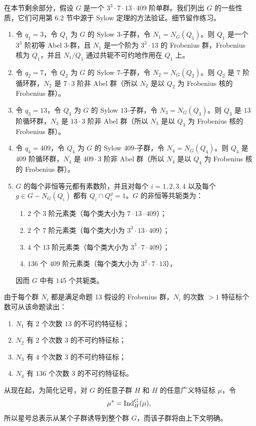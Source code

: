 在本节剩余部分，假设 $G$ 是一个 $3^3\cdot7\cdot13\cdot409$ 阶单群。我们列出 $G$ 的一些性质，它们可用第 6.2 节中源于 Sylow 定理的方法验证。细节留作练习。
\begin{enumerate}[label=(\arabic*)]
  \item 令 $q_1=3$，令 $Q_1$ 为 $G$ 的 Sylow $3$-子群，令 $N_1=N_G(Q_1)$。则 $Q_1$ 是一个 $3^3$ 阶初等 Abel $3$-群，且 $N_1$ 是一个阶为 $3^3\cdot13$ 的 Frobenius 群，Frobenius 核为 $Q_1$，并且 $N_1/Q_1$ 通过共轭不可约地作用在 $Q_1$ 上。
  \item 令 $q_2=7$，令 $Q_2$ 为 $G$ 的 Sylow $7$-子群，令 $N_2=N_G(Q_2)$。则 $Q_2$ 是 $7$ 阶循环群，$N_2$ 是 $7\cdot3$ 阶非 Abel 群（所以 $N_2$ 是以 $Q_2$ 为 Frobenius 核的 Frobenius 群）。
  \item 令 $q_3=13$，令 $Q_3$ 为 $G$ 的 Sylow $13$-子群，令 $N_3=N_G(Q_3)$。则 $Q_3$ 是 $13$ 阶循环群，$N_3$ 是 $13\cdot3$ 阶非 Abel 群（所以 $N_3$ 是以 $Q_3$ 为 Frobenius 核的 Frobenius 群）。
  \item 令 $q_4=409$，令 $Q_4$ 为 $G$ 的 Sylow $409$-子群，令 $N_4=N_G(Q_4)$。则 $Q_4$ 是 $409$ 阶循环群，$N_4$ 是 $409\cdot3$ 阶非 Abel 群（所以 $N_4$ 是以 $Q_4$ 为 Frobenius 核的 Frobenius 群）。
  \item $G$ 的每个非恒等元都有素数阶，并且对每个 $i=1,2,3,4$ 以及每个 $g\in G-N_G(Q_i)$ 都有 $Q_i\cap Q_i^g=1$。$G$ 的非恒等共轭类为：
  \begin{enumerate}[label=(\alph*)]
    \item $2$ 个 $3$ 阶元素类（每个类大小为 $7\cdot13\cdot409$）；
    \item $2$ 个 $7$ 阶元素类（每个类大小为 $3^3\cdot13\cdot409$）；
    \item $4$ 个 $13$ 阶元素类（每个类大小为 $3^3\cdot7\cdot409$）；
    \item $136$ 个 $409$ 阶元素类（每个类大小为 $3^3\cdot7\cdot13$），
  \end{enumerate}
  因而 $G$ 中有 $145$ 个共轭类。
\end{enumerate}
由于每个群 $N_i$ 都是满足命题 13 假设的 Frobenius 群，$N_i$ 的次数 $>1$ 特征标个数可从该命题读出：
\begin{enumerate}[label=(\roman*)]
  \item $N_1$ 有 $2$ 个次数 $13$ 的不可约特征标；
  \item $N_2$ 有 $2$ 个次数 $3$ 的不可约特征标；
  \item $N_3$ 有 $4$ 个次数 $3$ 的不可约特征标；
  \item $N_4$ 有 $136$ 个次数 $3$ 的不可约特征标。
\end{enumerate}
从现在起，为简化记号，对 $G$ 的任意子群 $H$ 和 $H$ 的任意广义特征标 $\mu$，令
\[
  \mu^*=\operatorname{Ind}_H^G(\mu),
\]
所以星号总表示从某个子群诱导到整个群 $G$，而该子群将由上下文明确。

